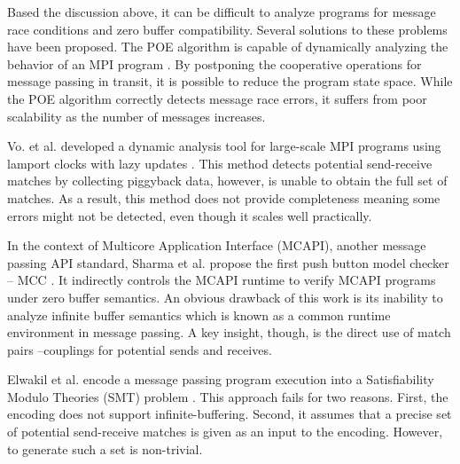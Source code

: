 Based the discussion above, it can be difficult to analyze programs for message race conditions and zero buffer compatibility. Several solutions to these problems have been proposed. The POE algorithm is capable of dynamically analyzing the behavior of an MPI program \cite{DBLP:conf/ppopp/VakkalankaSGK08}. By postponing the cooperative operations for message passing in transit, it is possible to reduce the program state space. While the POE algorithm correctly detects message race errors, it suffers from poor scalability as the number of messages increases. 

Vo. et al. developed a dynamic analysis tool for large-scale MPI programs using lamport clocks with lazy updates \cite{DBLP:conf/sc/VoAGSSB10, DBLP:conf/IEEEpact/VoGKSSB11}. This method detects potential send-receive matches by collecting piggyback data, however, is unable to obtain the full set of matches. As a result, this method does not provide completeness meaning some errors might not be detected, even though it scales well practically.

In the context of Multicore Application Interface (MCAPI), another message passing API standard, Sharma et al. propose the first push button model checker -- MCC \cite{DBLP:conf/fmcad/SharmaGMH09}. It indirectly controls the MCAPI runtime to verify MCAPI programs under zero buffer semantics. An obvious drawback of this work is its inability to analyze infinite buffer semantics which is known as a common runtime environment in message passing. A key insight, though, is the direct use of match pairs --couplings for potential sends and receives.

Elwakil et al. encode a message passing program execution into a Satisfiability Modulo Theories (SMT) \cite{barrett2008satisfiability} problem \cite{DBLP:conf/issta/ElwakilY10}. This approach fails for two reasons. First, the encoding does not support infinite-buffering. Second, it assumes that a precise set of potential send-receive matches is given as an input to the encoding. However, to generate such a set is non-trivial.

